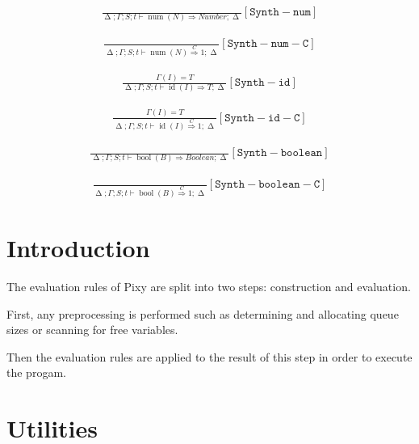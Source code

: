 \documentclass{scrartcl}
\DeclareMathOperator{\num}{num}
\DeclareMathOperator{\id}{id}
\DeclareMathOperator{\bool}{bool}
\DeclareMathOperator{\gtypes}{\Delta}
\begin{document}
    \begin{align*}
    \frac{}{
        \gtypes; \Gamma; S; t \vdash \num(N) \Rightarrow Number; \gtypes
    }[\mathtt{Synth-num}]
    \end{align*}
    
    \begin{align*}
    \frac{}{
        \gtypes; \Gamma; S; t \vdash \num(N) \overset{C}{\Rightarrow} 1; \gtypes
    }[\mathtt{Synth-num-C}]
    \end{align*}
    
    \begin{align*}
    \frac{
        \Gamma(I) = T
    }{
        \gtypes; \Gamma; S; t \vdash \id(I) \Rightarrow T; \gtypes
    }[\mathtt{Synth-id}]
    \end{align*}
    
    \begin{align*}
    \frac{
        \Gamma(I) = T
    }{
        \gtypes; \Gamma; S; t \vdash \id(I) \overset{C}{\Rightarrow} 1; \gtypes
    }[\mathtt{Synth-id-C}]
    \end{align*}
    
    \begin{align*}
    \frac{}{
        \gtypes; \Gamma; S; t \vdash \bool(B) \Rightarrow Boolean; \gtypes
    }[\mathtt{Synth-boolean}]
    \end{align*}
    
    \begin{align*}
    \frac{}{
        \gtypes; \Gamma; S; t \vdash \bool(B) \overset{C}{\Rightarrow} 1; \gtypes
    }[\mathtt{Synth-boolean-C}]
    \end{align*}
    
    \section{Introduction}
    
    The evaluation rules of Pixy are split into two steps: construction and evaluation.
    
    First, any preprocessing is performed such as determining and allocating queue sizes or scanning for free variables.
    
    Then the evaluation rules are applied to the result of this step in order to execute the progam.
    
    \section{Utilities}
    
\end{document}
